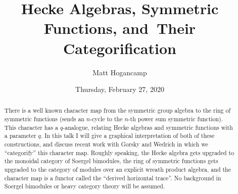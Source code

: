 \documentclass{UAmathtalk}
\author{Matt Hogancamp}
\title{Hecke Algebras, Symmetric Functions, and~Their Categorification}
\date{Thursday, February 27, 2020}
\begin{document}
\maketitle

\begin{abstract}
There is a well known character map from the symmetric group algebra to the ring of symmetric functions (sends an $n$-cycle to the $n$-th power sum symmetric function).  This character has a $q$-analogue, relating Hecke algebras and symmetric functions with a parameter $q$.  In this talk I will give a graphical interpretation of both of these constructions, and discuss recent work with Gorsky and Wedrich in which we ``categorify'' this character map.  Roughly speaking, the Hecke algebra gets upgraded to the monoidal category of Soergel bimodules, the ring of symmetric functions gets upgraded to the category of modules over an explicit wreath product algebra, and the character map is a functor called the ``derived horizontal trace''.  No background in Soergel bimodules or heavy category theory will be assumed.
\end{abstract}
\end{document}
